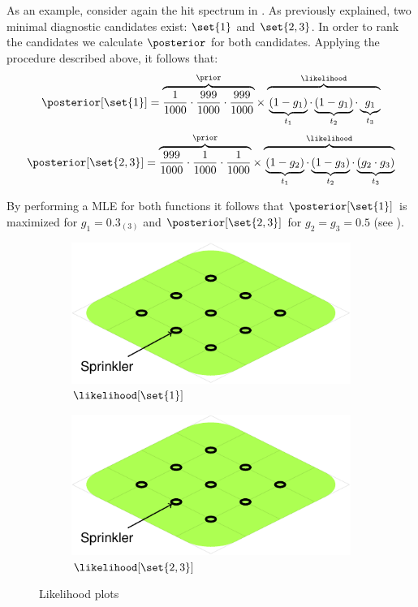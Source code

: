 As an example, consider again the hit spectrum in
.
%
As previously explained, two minimal diagnostic candidates exist:
$\set{1}$ and $\set{2,3}$.
%
In order to rank the candidates we calculate $\posterior$ for
both candidates.
%
Applying the procedure described above, it follows that:
\begin{equation}
  \posterior[\set{1}] =
  \overbrace{
    \frac{1}{1000} \cdot
    \frac{999}{1000} \cdot
    \frac{999}{1000}
  }^{\prior}
  \times
  \overbrace{\vphantom{\frac{1}{1}}
    \underbrace{(1-g_1)}_{t_1}
    \cdot
    \underbrace{(1-g_1)}_{t_2}
    \cdot
    \underbrace{g_1}_{t_3}
  }^{\likelihood}
\end{equation}
\begin{equation}
  \posterior[\set{2,3}] =
  \overbrace{
    \frac{999}{1000} \cdot
    \frac{1}{1000} \cdot
    \frac{1}{1000}}^{\prior}
  \times
  \overbrace{\vphantom{\frac{1}{1}}
    \underbrace{(1-g_2)}_{t_1}
    \cdot
    \underbrace{(1-g_3)}_{t_2}
    \cdot
    \underbrace{(g_2\cdot g_3)}_{t_3}
  }^{\likelihood}
\end{equation}

By performing a \ac{MLE} for both functions it follows that
$\posterior[\set{1}]$ is maximized for $g_1=0.3_{(3)}$ and
$\posterior[\set{2,3}]$ for $g_2 = g_3 = 0.5$ (see
).

\begin{figure}[!ht]
  \begin{subfigure}{0.45\columnwidth}
    \includegraphics[page=9]{figures/introduction/figures/main.pdf}
    \caption{$\likelihood[\set{1}]$}
  \end{subfigure}
  \begin{subfigure}{0.45\columnwidth}
    \includegraphics[page=10]{figures/introduction/figures/main.pdf}
    \caption{$\likelihood[\set{2,3}]$}
  \end{subfigure}
  \caption{Likelihood plots\label{fig:intro:likelihood-plots}}
\end{figure}

